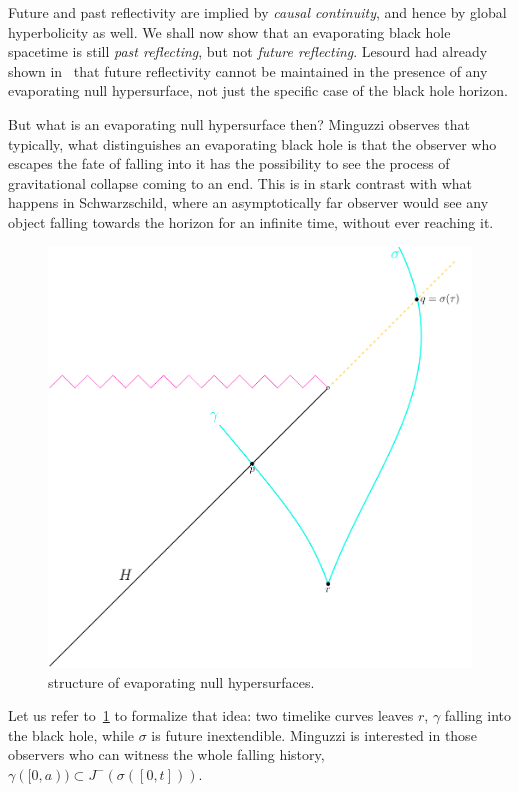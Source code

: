 	Future and past reflectivity are implied by \emph{causal continuity}, and hence by global hyperbolicity as well. We shall now show that an evaporating black hole spacetime is still \emph{past reflecting}, but not \emph{future reflecting}. Lesourd had already shown in~\cite[]{lesourd2018causal} that future reflectivity cannot be
	maintained in the presence of any evaporating null hypersurface, not just the specific case of the black hole horizon. 

	But what is an evaporating null hypersurface then? Minguzzi observes that typically, what distinguishes an evaporating black hole is that the observer who escapes the fate of falling into it has the possibility to see the process of gravitational collapse coming to an end. This is in stark contrast with what happens in Schwarzschild, where an asymptotically far observer would see any object falling towards the horizon for an infinite time, without ever reaching it.

	\begin{figure}
		\centering
		\includegraphics[scale=0.5]{Immagini/evaporating-surfaces/evaporating-surfaces.pdf}
		\caption{structure of evaporating null hypersurfaces.}
		\label{fig:evaporating-surface}
	\end{figure}

	Let us refer to~\ref{fig:evaporating-surface} to formalize that idea: two timelike curves leaves \(r\), \(\gamma\) falling into the black hole, while \(\sigma\) is future inextendible. Minguzzi is interested in those observers who can witness the whole falling history, \(\gamma ([0,a)) \subset J^-(\sigma([0,t]))\).

